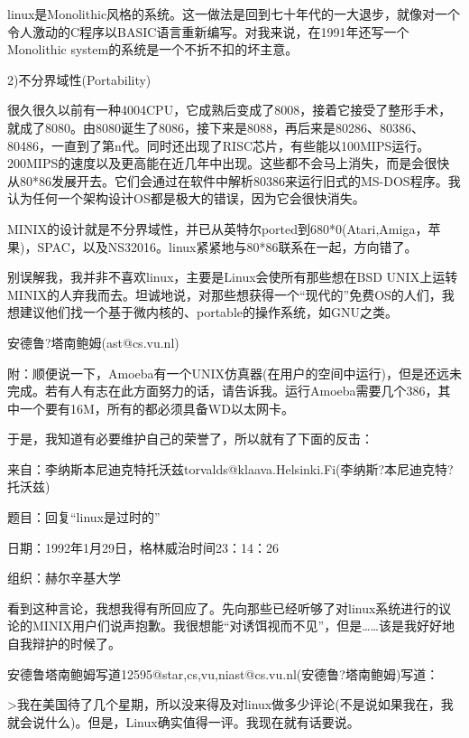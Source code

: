 linux是Monolithic风格的系统。这一做法是回到七十年代的一大退步，就像对一个令人激动的C程序以BASIC语言重新编写。对我来说，在1991年还写一个Monolithic system的系统是一个不折不扣的坏主意。

2)不分界域性(Portability)

很久很久以前有一种4004CPU，它成熟后变成了8008，接着它接受了整形手术，就成了8080。由8080诞生了8086，接下来是8088，再后来是80286、80386、80486，一直到了第n代。同时还出现了RISC芯片，有些能以100MIPS运行。200MIPS的速度以及更高能在近几年中出现。这些都不会马上消失，而是会很快从80*86发展开去。它们会通过在软件中解析80386来运行旧式的MS-DOS程序。我认为任何一个架构设计OS都是极大的错误，因为它会很快消失。

MINIX的设计就是不分界域性，并已从英特尔ported到680*0(Atari,Amiga，苹果)，SPAC，以及NS32016。linux紧紧地与80*86联系在一起，方向错了。

别误解我，我并非不喜欢linux，主要是Linux会使所有那些想在BSD UNIX上运转MINIX的人弃我而去。坦诚地说，对那些想获得一个“现代的”免费OS的人们，我想建议他们找一个基于微内核的、portable的操作系统，如GNU之类。

 

安德鲁?塔南鲍姆(ast@cs.vu.nl)

 

附：顺便说一下，Amoeba有一个UNIX仿真器(在用户的空间中运行)，但是还远未完成。若有人有志在此方面努力的话，请告诉我。运行Amoeba需要几个386，其中一个要有16M，所有的都必须具备WD以太网卡。

 

于是，我知道有必要维护自己的荣誉了，所以就有了下面的反击：

 

来自：李纳斯本尼迪克特托沃兹torvalds@klaava.Helsinki.Fi(李纳斯?本尼迪克特?托沃兹)

题目：回复“linux是过时的”

日期：1992年1月29日，格林威治时间23：14：26

组织：赫尔辛基大学

 

看到这种言论，我想我得有所回应了。先向那些已经听够了对linux系统进行的议论的MINIX用户们说声抱歉。我很想能“对诱饵视而不见”，但是……该是我好好地自我辩护的时候了。

 

安德鲁塔南鲍姆写道12595@star,cs,vu,niast@cs.vu.nl(安德鲁?塔南鲍姆)写道：

>我在美国待了几个星期，所以没来得及对linux做多少评论(不是说如果我在，我就会说什么)。但是，Linux确实值得一评。我现在就有话要说。

